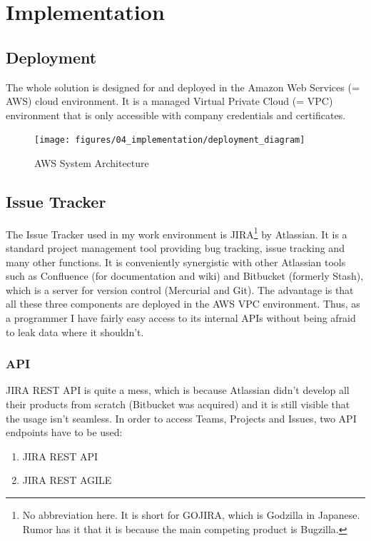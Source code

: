 \chapter{Implementation}

\section{Deployment}

The whole solution is designed for and deployed in the Amazon Web Services (= AWS) cloud environment. It is a managed Virtual Private Cloud (= VPC) environment that is only accessible with company credentials and certificates.

\begin{figure}[!ht]
	\centering
	\texttt{[image: figures/04\_implementation/deployment\_diagram]}
    \caption{AWS System Architecture}
\end{figure}

\section{Issue Tracker}

The Issue Tracker used in my work environment is JIRA\footnote{No abbreviation here. It is short for GOJIRA, which is Godzilla in Japanese. Rumor has it that it is because the main competing product is Bugzilla.} by Atlassian. It is a standard project management tool providing bug tracking, issue tracking and many other functions. It is conveniently synergistic with other Atlassian tools such as Confluence (for documentation and wiki) and Bitbucket (formerly Stash), which is a server for version control (Mercurial and Git). The advantage is that all these three components are deployed in the AWS VPC environment. Thus, as a programmer I have fairly easy access to its internal APIs without being afraid to leak data where it shouldn't.

\subsection{API}

JIRA REST API is quite a mess, which is because Atlassian didn't develop all their products from scratch (Bitbucket was acquired) and it is still visible that the usage isn't seamless. In order to access Teams, Projects and Issues, two API endpoints have to be used:

\begin{enumerate}
	\item JIRA REST API
	\item JIRA REST AGILE
\end{enumerate}


